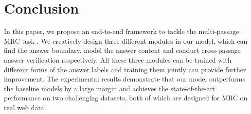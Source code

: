 \section{Conclusion}
\label{conclusion}

In this paper, we propose an end-to-end framework to tackle the multi-passage MRC task . We creatively design three different modules in our model, which can find the answer boundary, model the answer content and conduct cross-passage answer verification respectively. All these three modules can be trained with different forms of the answer labels and training them jointly can provide further improvement. The experimental results demonstrate that our model outperforms the baseline models by a large margin and achieves the state-of-the-art performance on two challenging datasets, both of which are designed for MRC on real web data.
